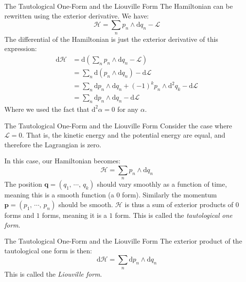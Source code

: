 \documentclass{beamer}
\begin{document}
    \begin{frame}{The Tautological One-Form and the Liouville Form}
        The Hamiltonian can be rewritten using the exterior derivative. We have:
        \[
            \mathcal{H}
            =\sum_{n}p_{n}\land\textrm{d}q_{n}-\mathcal{L}
        \]
        The differential of the Hamiltonian is just the exterior derivative of
        this expression:
        \[
            \begin{aligned}
                \textrm{d}\mathcal{H}
                &=\textrm{d}\left(
                    \sum_{n}p_{n}\land\textrm{d}q_{n}-\mathcal{L}
                \right)\\
                &=\sum_{n}\textrm{d}\left(
                    p_{n}\land\textrm{d}q_{n}
                \right)-\textrm{d}\mathcal{L}\\
                &=\sum_{n}
                    \textrm{d}p_{n}\land\textrm{d}q_{n}
                    +(-1)^{k}p_{n}\land\textrm{d}^{2}q_{k}
                    -\textrm{d}\mathcal{L}\\
                    &=\sum_{n}
                    \textrm{d}p_{n}\land\textrm{d}q_{n}
                    -\textrm{d}\mathcal{L}
            \end{aligned}
        \]
        Where we used the fact that $\textrm{d}^{2}\alpha=0$ for any $\alpha$.
    \end{frame}
    \begin{frame}{The Tautological One-Form and the Liouville Form}
        Consider the case where $\mathcal{L}=0$. That is, the kinetic energy and
        the potential energy are equal, and therefore the Lagrangian is zero.
        \par\hfill\par
        In this case, our Hamiltonian becomes:
        \[
            \mathcal{H}
            =\sum_{n}p_{n}\land\textrm{d}q_{n}
        \]
        The position $\mathbf{q}=(q_{1},\,\cdots,\,q_{k})$ should vary smoothly
        as a function of time, meaning this is a smooth function (a 0 form).
        Similarly the momentum $\mathbf{p}=(p_{1},\,\cdots,\,p_{n})$ should be
        smooth. $\mathcal{H}$ is thus a sum of exterior products of $0$ forms
        and $1$ forms, meaning it is a $1$ form. This is called the
        \textit{tautological one form}.
    \end{frame}
    \begin{frame}{The Tautological One-Form and the Liouville Form}
        The exterior product of the tautological one form is then:
        \[
            \textrm{d}\mathcal{H}
            =\sum_{n}\textrm{d}p_{n}\land\textrm{d}q_{n}
        \]
        This is called the \textit{Liouville form}.
    \end{frame}
\end{document}
